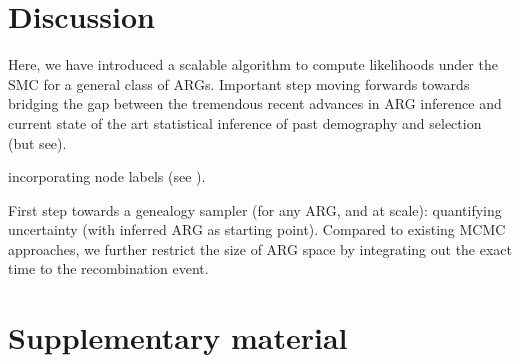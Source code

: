 \documentclass{article}
\begin{document}
\section{Discussion}
Here, we have introduced a scalable algorithm to compute likelihoods 
under the SMC for a general class of ARGs. 
Important step moving forwards towards bridging the gap between the tremendous 
recent advances in ARG inference and current state of the art statistical inference of 
past demography and selection (but see). %


incorporating node labels (see \citep{guo_recombination-aware_2022}).


First step towards a genealogy sampler (for any ARG, and at scale): 
quantifying uncertainty 
(with inferred ARG as starting point). Compared to existing MCMC approaches, 
we further restrict the size of ARG space by 
integrating out the exact time to the recombination event.






\section{Supplementary material}
\end{document}
